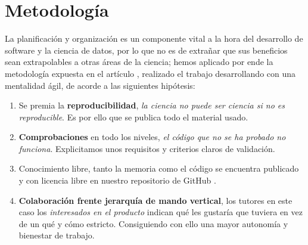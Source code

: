 %

\chapter{Metodología}

La planificación y organización es un componente vital a la hora del desarrollo de software 
y la ciencia de datos, por lo que no es de extrañar que sus beneficios sean extrapolables
a otras áreas de la ciencia; 
hemos aplicado por ende la 
metodología expuesta en el artículo \cite{DBLP:journals/corr/abs-2104-12545}, realizado 
el trabajo desarrollando con una mentalidad ágil, de acorde a las siguientes hipótesis: 

\begin{enumerate}
    \item Se premia la \textbf{reproducibilidad}, \textit{la ciencia no puede ser ciencia si no es reproducible}. Es por 
    ello que se publica todo el material usado. 
    \item \textbf{Comprobaciones} en todo los niveles, \textit{el código que no se ha probado no funciona}. 
    Explicitamos unos requisitos y criterios claros de validación. 
    \item Conocimiento libre, tanto la memoria como el código se encuentra publicado y con licencia libre en nuestro repositorio 
    de GitHub \cite{TFG-Estudio-de-las-redes-neuronales}.
    \item \textbf{Colaboración frente jerarquía de mando vertical}, los tutores en este caso 
    los \textit{interesados en el producto} 
    indican qué les gustaría que tuviera en vez de un qué y cómo estricto. Consiguiendo con ello una mayor autonomía y bienestar de trabajo.
     
\end{enumerate}  


